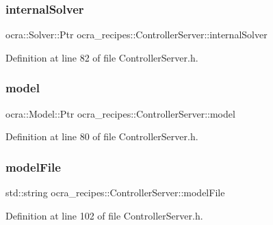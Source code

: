 \subsubsection{\texorpdfstring{internal\+Solver}{internalSolver}}
{\footnotesize\ttfamily ocra\+::\+Solver\+::\+Ptr ocra\+\_\+recipes\+::\+Controller\+Server\+::internal\+Solver\hspace{0.3cm}{\ttfamily [protected]}}



Definition at line 82 of file Controller\+Server.\+h.

\hypertarget{classocra__recipes_1_1ControllerServer_ab239e92da81b48afa2211ef9b25672f3}{}\label{classocra__recipes_1_1ControllerServer_ab239e92da81b48afa2211ef9b25672f3} 
\subsubsection{\texorpdfstring{model}{model}}
{\footnotesize\ttfamily ocra\+::\+Model\+::\+Ptr ocra\+\_\+recipes\+::\+Controller\+Server\+::model\hspace{0.3cm}{\ttfamily [protected]}}



Definition at line 80 of file Controller\+Server.\+h.

\hypertarget{classocra__recipes_1_1ControllerServer_ab077706b924eed4ac5c50e9ade36acf4}{}\label{classocra__recipes_1_1ControllerServer_ab077706b924eed4ac5c50e9ade36acf4} 
\subsubsection{\texorpdfstring{model\+File}{modelFile}}
{\footnotesize\ttfamily std\+::string ocra\+\_\+recipes\+::\+Controller\+Server\+::model\+File\hspace{0.3cm}{\ttfamily [protected]}}



Definition at line 102 of file Controller\+Server.\+h.

\hypertarget{classocra__recipes_1_1ControllerServer_a5c565a9ec45e5fad7b56e9a48609ef3d}{}\label{classocra__recipes_1_1ControllerServer_a5c565a9ec45e5fad7b56e9a48609ef3d} 
